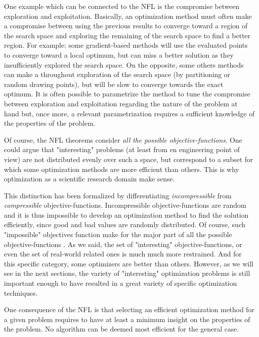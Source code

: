 One example which can be connected to the NFL is the compromise between exploration and exploitation. Basically, an optimization method must often make a compromise between using the previous results to converge toward a region of the search space and exploring the remaining of the search space to find a better region.
For example: some gradient-based methods will use the evaluated points to converge toward a local optimum, but can miss a better solution as they insufficiently explored the search space. On the opposite, some others methods can make a throughout exploration of the search space (by partitioning or random drawing points), but will be slow to converge towards the exact optimum.
It is often possible to parametrize the method to tune the compromise between exploration and exploitation regarding the nature of the problem at hand but, once more, a relevant parametrization requires a sufficient knowledge of the properties of the problem.

Of course, the NFL theorems consider \emph{all the possible objective-functions}. One could argue that "interesting" problems (at least from en engineering point of view) are not distributed evenly over such a space, but correspond to a subset for which some optimization methods are more efficient than others. This is why optimization as a scientific research domain make sense. 

This distinction has been formalized by differentiating \emph{incompressible} from \emph{compressible} objective-functions. Incompressible objective-functions are random and it is thus impossible to develop an optimization method to find the solution efficiently, since good and bad values are randomly distributed. Of course, such "impossible" objectives function make for the major part of all the possible objective-functions \cite{English:3-540-45356-3_7}.
As we said, the set of "interesting" objective-functions, or even the set of real-world related ones is much much more restrained. And for this specific category, some optimizers are better than others. 
However, as we will see in the next sections, the variety of "interesting" optimization problems is still important enough to have resulted in a great variety of specific optimization techniques.

One consequence of the NFL is that selecting an efficient optimization method for a given problem requires to have at least a minimum insight on the properties of the problem. No algorithm can be deemed most efficient for the general case.

